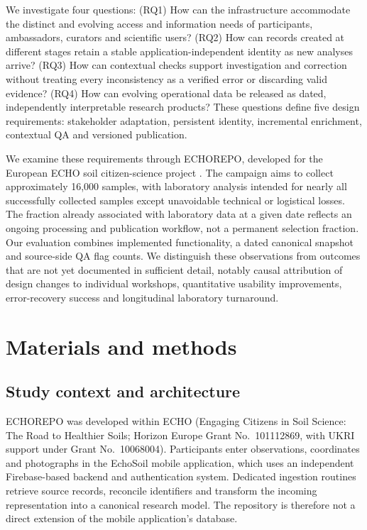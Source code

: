 \documentclass[11pt,a4paper]{article}
\newcommand{\repo}{\textsc{ECHOREPO}}
\begin{document}
We investigate four questions: (RQ1) How can the infrastructure accommodate the distinct and evolving access and information needs of participants, ambassadors, curators and scientific users? (RQ2) How can records created at different stages retain a stable application-independent identity as new analyses arrive? (RQ3) How can contextual checks support investigation and correction without treating every inconsistency as a verified error or discarding valid evidence? (RQ4) How can evolving operational data be released as dated, independently interpretable research products? These questions define five design requirements: stakeholder adaptation, persistent identity, incremental enrichment, contextual QA and versioned publication.

We examine these requirements through \repo, developed for the European ECHO soil citizen-science project \parencite{echo2023project}. The campaign aims to collect approximately 16,000 samples, with laboratory analysis intended for nearly all successfully collected samples except unavoidable technical or logistical losses. The fraction already associated with laboratory data at a given date reflects an ongoing processing and publication workflow, not a permanent selection fraction. Our evaluation combines implemented functionality, a dated canonical snapshot and source-side QA flag counts. We distinguish these observations from outcomes that are not yet documented in sufficient detail, notably causal attribution of design changes to individual workshops, quantitative usability improvements, error-recovery success and longitudinal laboratory turnaround.

\section{Materials and methods}
\subsection{Study context and architecture}
ECHOREPO was developed within ECHO (Engaging Citizens in Soil Science: The Road to Healthier Soils; Horizon Europe Grant No.~101112869, with UKRI support under Grant No.~10068004). Participants enter observations, coordinates and photographs in the EchoSoil mobile application, which uses an independent Firebase-based backend and authentication system. Dedicated ingestion routines retrieve source records, reconcile identifiers and transform the incoming representation into a canonical research model. The repository is therefore not a direct extension of the mobile application's database.
\end{document}
